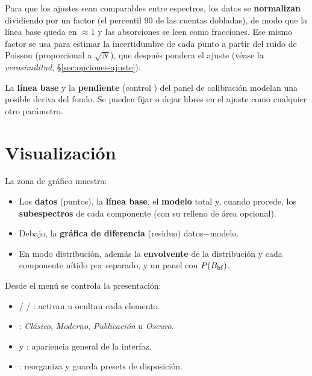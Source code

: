 Para que los ajustes sean comparables entre espectros, los datos se
\textbf{normalizan} dividiendo por un factor (el percentil 90 de las cuentas
dobladas), de modo que la línea base queda en $\approx 1$ y las absorciones se
leen como fracciones. Ese mismo factor se usa para estimar la incertidumbre de
cada punto a partir del ruido de Poisson (proporcional a $\sqrt{N}$), que después
pondera el ajuste (véase la \emph{verosimilitud}, §\ref{sec:opciones-ajuste}).

\begin{nota}
La \textbf{línea base} y la \textbf{pendiente} (control ) del
panel de calibración modelan una posible deriva del fondo. Se pueden fijar o
dejar libres en el ajuste como cualquier otro parámetro.
\end{nota}

\section{Visualización}

La zona de gráfico muestra:

\begin{itemize}[nosep]
  \item Los \textbf{datos} (puntos), la \textbf{línea base}, el \textbf{modelo}
        total y, cuando procede, los \textbf{subespectros} de cada componente
        (con su relleno de área opcional).
  \item Debajo, la \textbf{gráfica de diferencia} (residuo) datos$-$modelo.
  \item En modo distribución, además la \textbf{envolvente} de la distribución y
        cada componente nítido por separado, y un panel con $P(B_{\mathrm{hf}})$.
\end{itemize}

Desde el menú  se controla la presentación:

\begin{itemize}[nosep]
  \item {} /  /
        : activan u ocultan cada elemento.
  \item {}: \emph{Clásico}, \emph{Moderno},
        \emph{Publicación} u \emph{Oscuro}.
  \item {} y : apariencia general de
        la interfaz.
  \item {}: reorganiza y guarda presets
        de disposición.
\end{itemize}

